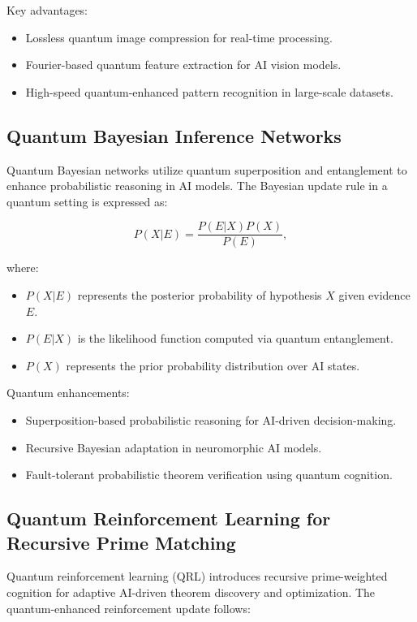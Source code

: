 \documentclass{article}
\theoremstyle{plain}
\begin{document}
Key advantages:
\begin{itemize}
    \item Lossless quantum image compression for real-time processing.
    \item Fourier-based quantum feature extraction for AI vision models.
    \item High-speed quantum-enhanced pattern recognition in large-scale datasets.
\end{itemize}

\subsection{Quantum Bayesian Inference Networks}

Quantum Bayesian networks utilize quantum superposition and entanglement to enhance probabilistic reasoning in AI models. The Bayesian update rule in a quantum setting is expressed as:

\begin{equation}
P(X | E) = \frac{P(E | X) P(X)}{P(E)},
\end{equation}

where:
\begin{itemize}
    \item $P(X | E)$ represents the posterior probability of hypothesis $X$ given evidence $E$.
    \item $P(E | X)$ is the likelihood function computed via quantum entanglement.
    \item $P(X)$ represents the prior probability distribution over AI states.
\end{itemize}

Quantum enhancements:
\begin{itemize}
    \item Superposition-based probabilistic reasoning for AI-driven decision-making.
    \item Recursive Bayesian adaptation in neuromorphic AI models.
    \item Fault-tolerant probabilistic theorem verification using quantum cognition.
\end{itemize}

\subsection{Quantum Reinforcement Learning for Recursive Prime Matching}

Quantum reinforcement learning (QRL) introduces recursive prime-weighted cognition for adaptive AI-driven theorem discovery and optimization. The quantum-enhanced reinforcement update follows:
\end{document}
